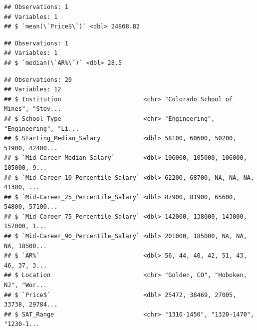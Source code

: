 \documentclass[]{article}
\newenvironment{Shaded}{\begin{snugshade}}{\end{snugshade}}
\newcommand{\KeywordTok}[1]{\textcolor[rgb]{0.13,0.29,0.53}{\textbf{#1}}}
\newcommand{\DataTypeTok}[1]{\textcolor[rgb]{0.13,0.29,0.53}{#1}}
\newcommand{\FloatTok}[1]{\textcolor[rgb]{0.00,0.00,0.81}{#1}}
\newcommand{\StringTok}[1]{\textcolor[rgb]{0.31,0.60,0.02}{#1}}
\newcommand{\OperatorTok}[1]{\textcolor[rgb]{0.81,0.36,0.00}{\textbf{#1}}}
\newcommand{\NormalTok}[1]{#1}
\begin{document}
\begin{verbatim}
## Observations: 1
## Variables: 1
## $ `mean(\`Price$\`)` <dbl> 24868.82
\end{verbatim}

\begin{Shaded}
\end{Shaded}

\begin{verbatim}
## Observations: 1
## Variables: 1
## $ `median(\`AR%\`)` <dbl> 28.5
\end{verbatim}

\begin{Shaded}
\end{Shaded}

\begin{verbatim}
## Observations: 20
## Variables: 12
## $ Institution                       <chr> "Colorado School of Mines", "Stev...
## $ School_Type                       <chr> "Engineering", "Engineering", "Li...
## $ Starting_Median_Salary            <dbl> 58100, 60600, 50200, 51900, 42400...
## $ `Mid-Career_Median_Salary`        <dbl> 106000, 105000, 106000, 105000, 9...
## $ `Mid-Career_10_Percentile_Salary` <dbl> 62200, 68700, NA, NA, NA, 41300, ...
## $ `Mid-Career_25_Percentile_Salary` <dbl> 87900, 81900, 65600, 54800, 57100...
## $ `Mid-Career_75_Percentile_Salary` <dbl> 142000, 138000, 143000, 157000, 1...
## $ `Mid-Career_90_Percentile_Salary` <dbl> 201000, 185000, NA, NA, NA, 18500...
## $ `AR%`                             <dbl> 56, 44, 40, 42, 51, 43, 46, 37, 3...
## $ Location                          <chr> "Golden, CO", "Hoboken, NJ", "Wor...
## $ `Price$`                          <dbl> 25472, 38469, 27005, 33738, 29784...
## $ SAT_Range                         <chr> "1310-1450", "1320-1470", "1230-1...
\end{verbatim}
\end{document}
